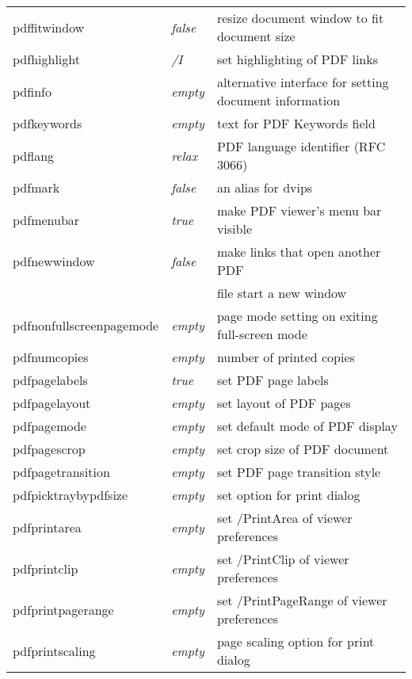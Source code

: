 \documentclass{article}
\begin{document}
\begin{longtable}{@{}>{\ttfamily}llp{7cm}@{}}
pdffitwindow       & \textit{false}         & resize document window to fit document size \\
pdfhighlight       & \textit{/I}            & set highlighting of PDF links \\
pdfinfo            & \textit{empty}         & alternative interface for setting document information\\
pdfkeywords        & \textit{empty}         & text for PDF Keywords field \\
pdflang            & \textit{relax}         & PDF language identifier (RFC 3066) \\
pdfmark            & \textit{false}         & an alias for \textsf{dvips} \\
pdfmenubar         & \textit{true}          & make PDF viewer's menu bar visible \\
pdfnewwindow       & \textit{false}         & make links that open another PDF \\
                   &                        & file start a new window \\
pdfnonfullscreenpagemode
                   & \textit{empty}         & page mode setting on exiting
                                              full-screen mode\\
pdfnumcopies       & \textit{empty}         & number of printed copies\\
pdfpagelabels      & \textit{true}          & set PDF page labels \\
pdfpagelayout      & \textit{empty}         & set layout of PDF pages \\
pdfpagemode        & \textit{empty}         & set default mode of PDF display \\
pdfpagescrop       & \textit{empty}         & set crop size of PDF document \\
pdfpagetransition  & \textit{empty}         & set PDF page transition style \\
pdfpicktraybypdfsize
                   & \textit{empty}         & set option for print dialog \\
pdfprintarea       & \textit{empty}         & set /PrintArea of viewer preferences \\
pdfprintclip       & \textit{empty}         & set /PrintClip of viewer preferences \\
pdfprintpagerange  & \textit{empty}         & set /PrintPageRange of viewer preferences \\
pdfprintscaling    & \textit{empty}         & page scaling option for print dialog \\

\end{longtable}
\end{document}
